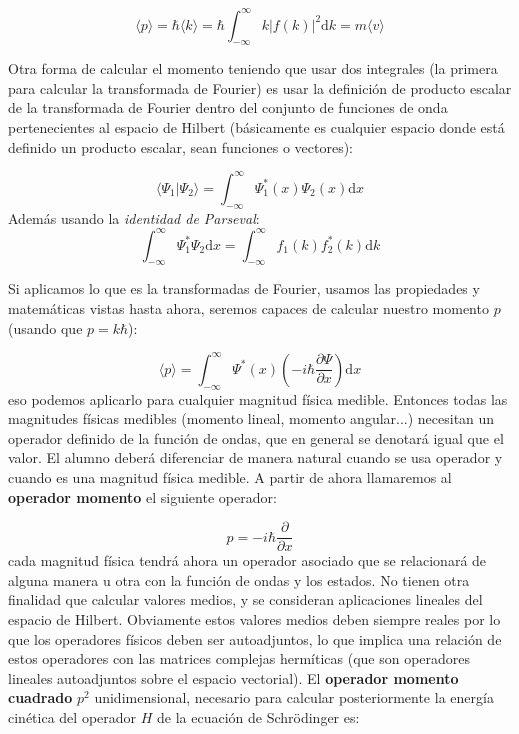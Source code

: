 \documentclass[12pt,a4paper]{article}
\numberwithin{equation}{section}
\numberwithin{figure}{section}
\newcommand{\parentesis}[1]{\left( #1  \right)}
\newcommand{\parciales}[2]{\frac{\partial #1}{\partial #2}}
\newcommand{\D}{\mathrm{d}}
\newcommand{\intf}{\int_{-\infty}^{\infty}}
\begin{document}
\begin{equation}
\langle p \rangle = \hbar \langle k \rangle = \hbar \intf k |f(k)|^2 \D k = m \langle v \rangle
\end{equation}

Otra forma de calcular el momento teniendo que usar dos integrales (la primera para calcular la transformada de Fourier) es usar la definición de producto escalar de la transformada de Fourier dentro del conjunto de funciones de onda pertenecientes al espacio de Hilbert (básicamente es cualquier espacio donde está definido un producto escalar, sean funciones o vectores):

\begin{equation}
\langle \Psi_1 | \Psi_2 \rangle = \intf \Psi_1^* (x) \Psi_2 (x) \D x
\end{equation}
Además usando la \textit{identidad de Parseval}:
\begin{equation}
\intf  \Psi_1^* \Psi_2 \D x = \intf f_1(k) f_2^* (k) \D k
\end{equation}

Si aplicamos lo que es la transformadas de Fourier, usamos las propiedades y matemáticas vistas hasta ahora, seremos capaces de calcular nuestro momento $p$ (usando que $p = k \hbar$):

\begin{equation} 
\langle p \rangle = \intf \Psi^* (x) \parentesis{- i \hbar \parciales{\Psi}{x}} \D x
\end{equation}
eso podemos aplicarlo para cualquier magnitud física medible. Entonces todas las magnitudes físicas medibles (momento lineal, momento angular...) necesitan un operador definido de la función de ondas, que en general se denotará igual que el valor. El alumno deberá diferenciar de manera natural cuando se usa operador y cuando es una magnitud física medible. A partir de ahora llamaremos al \textbf{operador momento} el siguiente operador:

\begin{equation}
p = - i \hbar \parciales{}{x} 
\end{equation}
cada magnitud física tendrá ahora un operador asociado que se relacionará de alguna manera u otra con la función de ondas y los estados. No tienen otra finalidad que calcular valores medios, y se consideran aplicaciones lineales del espacio de Hilbert. Obviamente estos valores medios deben siempre reales por lo que los operadores físicos deben ser autoadjuntos, lo que implica una relación de estos operadores con las matrices complejas hermíticas (que son operadores lineales autoadjuntos sobre el espacio vectorial).  El \textbf{operador momento cuadrado} $p^2$ unidimensional, necesario para calcular posteriormente la energía cinética del operador $H$ de la ecuación de Schrödinger es:
\end{document}
